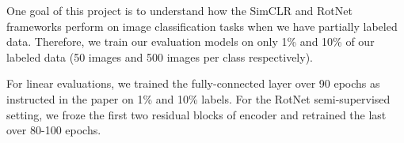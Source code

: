One goal of this project is to understand how the SimCLR and RotNet frameworks perform on image classification tasks when we have partially labeled data. Therefore, we train our evaluation models on only 1\% and 10\% of our labeled data (50 images and 500 images per class respectively).

For linear evaluations, we trained the fully-connected layer over 90 epochs as instructed in the paper \cite{SimCLR} on 1\% and 10\% labels. For the RotNet semi-supervised setting, we froze the first two residual blocks of encoder and retrained the last over 80-100 epochs.





